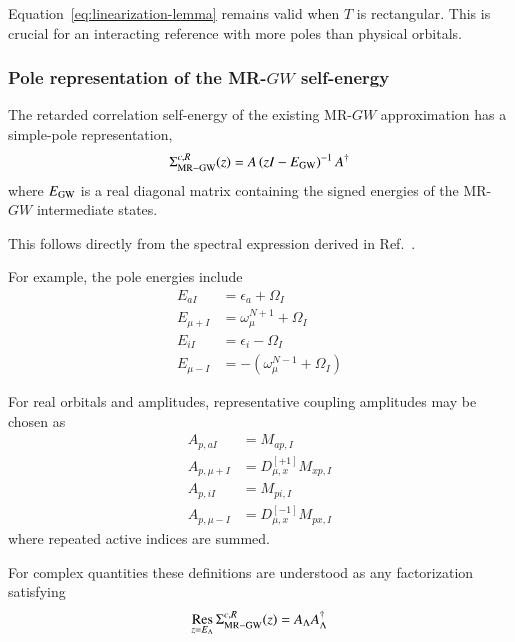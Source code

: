 \documentclass[aip,jcp,reprint,noshowkeys,superscriptaddress]{revtex4-1}
\begin{document}
Equation~\eqref{eq:linearization-lemma} remains valid when $T$ is
rectangular.  This is crucial for an interacting reference with more
poles than physical orbitals.


\subsubsection{Pole representation of the MR-$GW$ self-energy}

The retarded correlation self-energy of the existing MR-$GW$
approximation has a simple-pole representation,
\begin{equation}
  \Sigma_{\rm MR-GW}^{c,R}(z)
  =
  A
  \left(
    zI-E_{\rm GW}
  \right)^{-1}
  A^\dagger
  \label{eq:MRGW-self-energy-pole}
\end{equation}
where $E_{\rm GW}$ is a real diagonal matrix containing the signed
energies of the MR-$GW$ intermediate states.

This follows directly from the spectral expression derived in
Ref.~\cite{WangFangLi2026}.

For example, the pole energies include
\begin{subequations}
  \begin{align}
    E_{aI}
    &=
    \epsilon_a+\Omega_I
    \\
    E_{\mu+I}
    &=
    \omega_{\mu}^{N+1}+\Omega_I
    \\
    E_{iI}
    &=
    \epsilon_i-\Omega_I
    \\
    E_{\mu-I}
    &=
    -
    \left(
      \omega_{\mu}^{N-1}+\Omega_I
    \right)
  \end{align}
\end{subequations}

For real orbitals and amplitudes, representative coupling amplitudes
may be chosen as
\begin{subequations}
  \begin{align}
    A_{p,aI}
    &=
    M_{ap,I}
    \\
    A_{p,\mu+I}
    &=
    D_{\mu,x}^{[+1]}
    M_{xp,I}
    \\
    A_{p,iI}
    &=
    M_{pi,I}
    \\
    A_{p,\mu-I}
    &=
    D_{\mu,x}^{[-1]}
    M_{px,I}
  \end{align}
\end{subequations}
where repeated active indices are summed.

For complex quantities these definitions are understood as any
factorization satisfying
\begin{equation}
  \operatorname*{Res}_{z=E_\Lambda}
  \Sigma_{\rm MR-GW}^{c,R}(z)
  =
  A_\Lambda A_\Lambda^\dagger
\end{equation}
\end{document}
